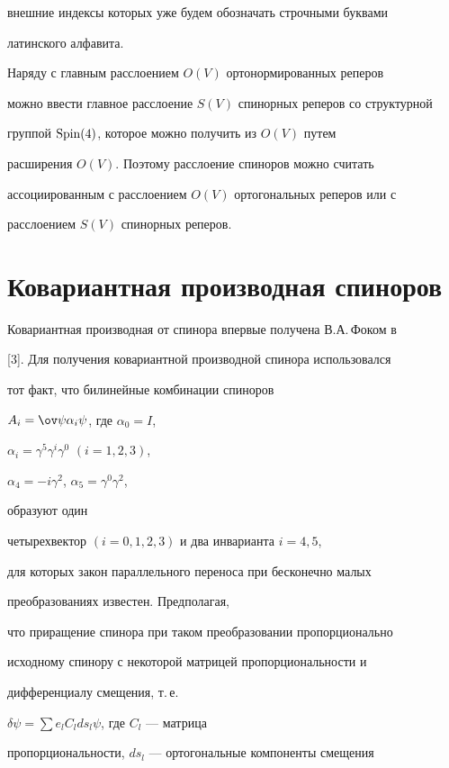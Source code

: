 внешние индексы которых уже будем обозначать строчными буквами


латинского алфавита.





Наряду с главным расслоением $O(V)$ ортонормированных реперов


можно ввести главное расслоение $S(V)$ спинорных реперов со структурной


группой $\operatorname{Spin}(4)$, которое можно получить из $O(V)$ путем


расширения $O(V)$. Поэтому расслоение спиноров можно считать


ассоциированным с расслоением $O(V)$ ортогональных реперов или с


расслоением $S(V)$ спинорных реперов.





\section{Ковариантная производная спиноров}





Ковариантная производная от спинора впервые получена В.А.\,Фоком в


[3]. Для получения ковариантной производной спинора использовался


тот факт, что билинейные комбинации спиноров


$A_i=\ov\psi{\alpha_i}{\psi}$, где $\alpha_0=I$,


${\alpha_i={\gamma^5}{\gamma^i}{\gamma^0}}$ $(i=1,2,3)$,


$\alpha_4={-i\gamma^2}$, ${{\alpha_5}={\gamma^0}{\gamma^2}}$,


образуют один


четырехвектор $(i=0,1,2,3)$ и два инварианта ${i=4,5}$,


для которых закон параллельного переноса при бесконечно малых


преобразованиях известен. Предполагая,


что приращение спинора при таком преобразовании пропорционально


исходному спинору с некоторой матрицей пропорциональности и


дифференциалу смещения, т.\,е.


${\delta\psi=\sum{e_lC_l{ds}_l\psi}}$, где $C_l$ --- матрица


пропорциональности, ${ds}_l$ --- ортогональные компоненты смещения


